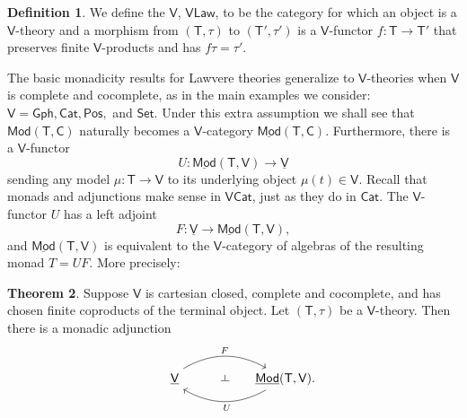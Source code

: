 \documentclass{amsart}
\newcommand{\define}[1]{{\bf \boldmath{#1}}}
\theoremstyle{definition}
\newtheorem{theorem}{Theorem}
\newtheorem{definition}[theorem]{Definition}
\def\ld{\rotatebox[origin=c]{-90}{$\dashv$}} %
\newcommand{\Gph}{\mathsf{Gph}}
\newcommand{\Set}{\mathsf{Set}}
\newcommand{\Cat}{\mathsf{Cat}}
\newcommand{\Law}{\mathsf{Law}}
\newcommand{\Pos}{\mathsf{Pos}}
\newcommand{\Mod}{\mathsf{Mod}}
\newcommand{\V}{\mathsf{V}}
\newcommand{\C}{\mathsf{C}}
\newcommand{\T}{\mathsf{T}}
\newcommand{\maps}{\colon}
\begin{document}
\begin{definition}
We define the \define{category of} $\V$\define{-theories}, $\V\Law$, to be the category for which an object is a $\V$-theory and a morphism from $(\T,\tau)$ to $(\T',\tau')$ is a $\V$-functor $f \maps \T \to \T'$ that preserves finite $\V$-products and has $f\tau = \tau'$.   
\end{definition}

The basic monadicity results for Lawvere theories generalize to $\V$-theories when $\V$ is  complete and cocomplete, as in the main examples we consider: $\V = \Gph, \Cat, \Pos,$ and $\Set$.   Under this extra assumption we shall see that $\Mod(\T,\C)$ naturally becomes a $\V$-category $\underline{\Mod}(\T,\C)$.  Furthermore, there is a $\V$-functor 
\[   U \maps \underline{\Mod}(\T,\V) \to \underline{\V} \]
sending any model  $\mu \maps \T \to \V$ to its underlying object $\mu(t) \in \V$.   
Recall that monads and adjunctions make sense in $\V\Cat$, just as they do in $\Cat$.  
The $\V$-functor $U$ has a left adjoint
\[   F \maps \underline{\V} \to \underline{\Mod}(\T,\V) ,\]
and $\underline{\Mod}(\T,\V)$ is equivalent to the $\V$-category of algebras of the resulting monad $T = UF$.  More precisely:

\begin{theorem}
\label{thm:monadicity}
Suppose $\V$ is cartesian closed, complete and cocomplete, and has chosen finite coproducts of the terminal object.  Let $(\T,\tau)$ be a $\V$-theory.  Then there is a monadic adjunction
\[\begin{tikzcd}[column sep=small]
\phantom{AA} \underline{\V} \arrow[bend left,below]{rr}{F}
& {\phantom{Aa} \ld} &
\arrow[bend left,above]{ll}{\;\, U} \underline{\Mod}(\T,\V).
\end{tikzcd}\]
\end{theorem}
\end{document}
